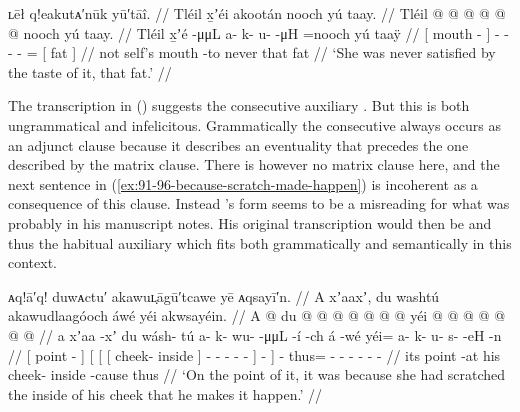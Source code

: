 \ex\label{ex:91-95-never-satisfied-taste-fat}%
%
\begingl
	\glpreamble	ʟēł q!eakutᴀ′nūk yū′tāî. //
	\glpreamble	Tléil x̱ʼéi akootán nooch yú taay. //
	\gla	Tléil {} {}  @ {} {}
		 @ {} @ {} @ {} @ {} @ \•nooch
		{} yú taay. {} //
	\glb	Tléil {} {} x̱ʼé -μμL {}
		a- k- u-  -μH =nooch
		{} yú taaÿ {} //
	\glc	{} {}[  mouth - {}]
		- - -  - =
		{}[  fat {}] //
	\gld	not {} self’s mouth -to {}
		 {} {} {} {} \•never
		{} that fat {} //
	\glft	‘She was never satisfied by the taste of it, that fat.’
		//
\endgl
\xe

The transcription  in (\lastx) suggests the consecutive auxiliary .
But this is both ungrammatical and infelicitous.
Grammatically the consecutive always occurs as an adjunct clause because it describes an eventuality that precedes the one described by the matrix clause.
There is however no matrix clause here, and the next sentence in (\ref{ex:91-96-because-scratch-made-happen}) is incoherent as a consequence of this clause.
Instead \citeauthor{swanton:1909}’s form seems to be a misreading  for what was probably  in his manuscript notes.
His original transcription would then be  and thus the habitual auxiliary  which fits both grammatically and semantically in this context.


\ex\label{ex:91-96-because-scratch-made-happen}%
%
\begingl
	\glpreamble	ᴀq!ā′q! duwᴀctu′ akawuʟ̣āgū′tcawe yē ᴀqsayī′n. //
	\glpreamble	A xʼaaxʼ, du washtú akawudlaagóoch áwé yéi akwsayéin. //
	\gla	{} A  @ {} {}
		{} {} {} du  @ {} {}
			 @ {} @ {} @ {} @ {} @ {} {} {} {}  @ {}
		yéi @  @ {} @ {} @ {} @ {} @ {} @ {} //
	\glb	{} a xʼaa -xʼ {}
		{} {} {} du wásh- tú {} 
			a- k- wu-  -μμL -í {} -ch {} á -wé
		 yéi= a- k- u- s-  -eH -n //
	\glc	{}[  point - {}]
		{}[ {}[ {}[  cheek- inside {}]
			- - -  - - {}] - {}]  -
		thus= - - - -  - - //
	\gld	{} its point -at {}
		{} {} {} his cheek- inside {}
			 {} {} {} {} {} {} -cause {}  {}
		thus  {} {} {} {} {} {} //
	\glft	‘On the point of it, it was because she had scratched the inside of his cheek that he makes it happen.’
		//
\endgl
\xe

